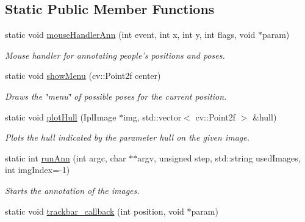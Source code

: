 \subsection*{Static Public Member Functions}
\begin{DoxyCompactItemize}
\item 
\hypertarget{classannotationsHandle_a2c3529417ce5c15e00e8bd8679a4db27}{
static void \hyperlink{classannotationsHandle_a2c3529417ce5c15e00e8bd8679a4db27}{mouseHandlerAnn} (int event, int x, int y, int flags, void $\ast$param)}
\label{classannotationsHandle_a2c3529417ce5c15e00e8bd8679a4db27}

\begin{DoxyCompactList}\small\item\em Mouse handler for annotating people's positions and poses. \item\end{DoxyCompactList}\item 
\hypertarget{classannotationsHandle_a0c54528792c5df34a30aea2d723c430f}{
static void \hyperlink{classannotationsHandle_a0c54528792c5df34a30aea2d723c430f}{showMenu} (cv::Point2f center)}
\label{classannotationsHandle_a0c54528792c5df34a30aea2d723c430f}

\begin{DoxyCompactList}\small\item\em Draws the \char`\"{}menu\char`\"{} of possible poses for the current position. \item\end{DoxyCompactList}\item 
\hypertarget{classannotationsHandle_aca8a149c748bca5861102edd06852378}{
static void \hyperlink{classannotationsHandle_aca8a149c748bca5861102edd06852378}{plotHull} (IplImage $\ast$img, std::vector$<$ cv::Point2f $>$ \&hull)}
\label{classannotationsHandle_aca8a149c748bca5861102edd06852378}

\begin{DoxyCompactList}\small\item\em Plots the hull indicated by the parameter {\ttfamily hull} on the given image. \item\end{DoxyCompactList}\item 
static int \hyperlink{classannotationsHandle_a7c977aa97e5e94662562cebc505cd6a9}{runAnn} (int argc, char $\ast$$\ast$argv, unsigned step, std::string usedImages, int imgIndex=-\/1)
\begin{DoxyCompactList}\small\item\em Starts the annotation of the images. \item\end{DoxyCompactList}\item 
\hypertarget{classannotationsHandle_ac8d0365f010294def2757bf31ba1207f}{
static void \hyperlink{classannotationsHandle_ac8d0365f010294def2757bf31ba1207f}{trackbar\_\-callback} (int position, void $\ast$param)}
\label{classannotationsHandle_ac8d0365f010294def2757bf31ba1207f}


\end{DoxyCompactItemize}
